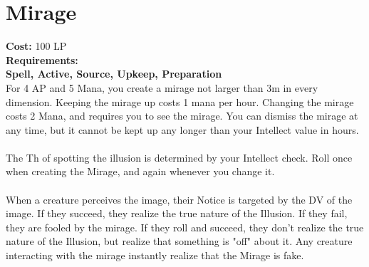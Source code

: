 \section{Mirage}\label{spell:mirage}
\textbf{Cost:} 100 LP\\
\textbf{Requirements:}\\
\textbf{Spell, Active, Source, Upkeep, Preparation}\\
For 4 AP and 5 Mana, you create a mirage not larger than 3m in every dimension.
Keeping the mirage up costs 1 mana per hour.
Changing the mirage costs 2 Mana, and requires you to see the mirage.
You can dismiss the mirage at any time, but it cannot be kept up any longer than your Intellect value in hours.\\
\\
The Th of spotting the illusion is determined by your Intellect check.
Roll once when creating the Mirage, and again whenever you change it. \\
\\
When a creature perceives the image, their Notice is targeted by the DV of the image.
If they succeed, they realize the true nature of the Illusion.
If they fail, they are fooled by the mirage.
If they roll and succeed, they don't realize the true nature of the Illusion, but realize that something is "off" about it.
Any creature interacting with the mirage instantly realize that the Mirage is fake.\\